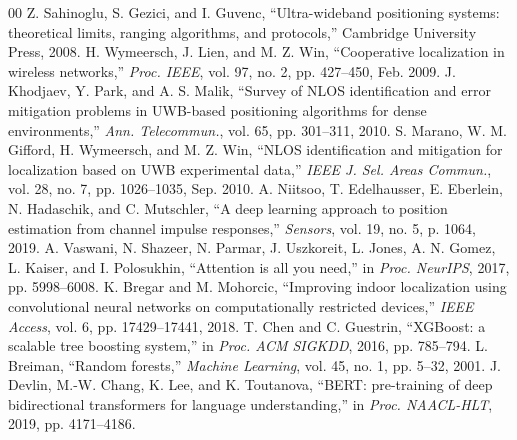 \documentclass[conference]{IEEEtran}
\begin{document}
\begin{thebibliography}{00}
 Z. Sahinoglu, S. Gezici, and I. Guvenc, ``Ultra-wideband positioning systems: theoretical limits, ranging algorithms, and protocols,'' Cambridge University Press, 2008.
 H. Wymeersch, J. Lien, and M. Z. Win, ``Cooperative localization in wireless networks,'' \textit{Proc. IEEE}, vol. 97, no. 2, pp. 427--450, Feb. 2009.
 J. Khodjaev, Y. Park, and A. S. Malik, ``Survey of NLOS identification and error mitigation problems in UWB-based positioning algorithms for dense environments,'' \textit{Ann. Telecommun.}, vol. 65, pp. 301--311, 2010.
 S. Marano, W. M. Gifford, H. Wymeersch, and M. Z. Win, ``NLOS identification and mitigation for localization based on UWB experimental data,'' \textit{IEEE J. Sel. Areas Commun.}, vol. 28, no. 7, pp. 1026--1035, Sep. 2010.
 A. Niitsoo, T. Edelhausser, E. Eberlein, N. Hadaschik, and C. Mutschler, ``A deep learning approach to position estimation from channel impulse responses,'' \textit{Sensors}, vol. 19, no. 5, p. 1064, 2019.
 A. Vaswani, N. Shazeer, N. Parmar, J. Uszkoreit, L. Jones, A. N. Gomez, L. Kaiser, and I. Polosukhin, ``Attention is all you need,'' in \textit{Proc. NeurIPS}, 2017, pp. 5998--6008.
 K. Bregar and M. Mohorcic, ``Improving indoor localization using convolutional neural networks on computationally restricted devices,'' \textit{IEEE Access}, vol. 6, pp. 17429--17441, 2018.
 T. Chen and C. Guestrin, ``XGBoost: a scalable tree boosting system,'' in \textit{Proc. ACM SIGKDD}, 2016, pp. 785--794.
 L. Breiman, ``Random forests,'' \textit{Machine Learning}, vol. 45, no. 1, pp. 5--32, 2001.
 J. Devlin, M.-W. Chang, K. Lee, and K. Toutanova, ``BERT: pre-training of deep bidirectional transformers for language understanding,'' in \textit{Proc. NAACL-HLT}, 2019, pp. 4171--4186.
\end{thebibliography}
\end{document}
